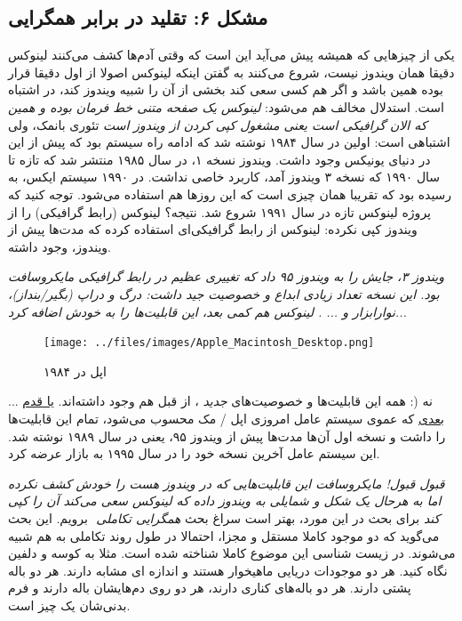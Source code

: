 \subsection*{مشکل ۶: تقلید در برابر همگرایی}
یکی از چیزهایی که همیشه پیش می‌آید این است که وقتی آدم‌ها کشف می‌کنند لینوکس دقیقا همان ویندوز نیست، شروع می‌کنند به گفتن اینکه لینوکس اصولا از اول دقیقا قرار بوده همین باشد و اگر هم کسی سعی کند بخشی از آن را شبیه ویندوز کند، در اشتباه است. استدلال مخالف هم می‌شود:
\emph{لینوکس یک صفحه متنی خط فرمان بوده و همین که الان گرافیکی است یعنی مشغول کپی کردن از ویندوز است}
تئوری بانمک، ولی اشتباهی است: اولین 
 در سال ۱۹۸۴ نوشته شد که ادامه راه سیستم 
 بود که پیش از این در دنیای یونیکس وجود داشت. ویندوز نسخه ۱، در سال ۱۹۸۵ منتشر شد که تازه تا سال ۱۹۹۰ که نسخه ۳ ویندوز آمد، کاربرد خاصی نداشت. در ۱۹۹۰ سیستم ایکس،‌ به 
 رسیده بود که تقریبا همان چیزی است که این روزها هم استفاده می‌شود. توجه کنید که پروژه لینوکس تازه در سال ۱۹۹۱ شروع شد. نتیجه؟ لینوکس 
 (رابط گرافیکی) را از ویندوز کپی نکرده: لینوکس از رابط گرافیکی‌ای استفاده کرده که مدت‌ها پیش از ویندوز، وجود داشته.

\emph{ویندوز ۳، جایش را به ویندوز ۹۵ داد که تغییری عظیم در رابط گرافیکی مایکروسافت بود. این نسخه تعداد زیادی ابداع و خصوصیت جید داشت:‌ درگ و دراپ (بگیر/بنداز)، نوارابزار و ... . لینوکس هم کمی بعد، این قابلیت‌ها را به خودش اضافه کرد...}
\begin{figure}[H]
\texttt{[image: ../files/images/Apple\_Macintosh\_Desktop.png]}
\caption*{اپل در ۱۹۸۴}
\end{figure}


... نه (: همه این قابلیت‌ها و خصوصیت‌های
\emph{جدید}
، از قبل هم وجود داشته‌اند.
\href{http://en.wikipedia.org/wiki/NeXTSTEP}{ یا قدم بعدی}
که عموی سیستم عامل امروزی اپل / مک محسوب می‌شود‌، تمام این قابلیت‌ها را داشت و نسخه اول آن‌ها مدت‌ها پیش از ویندوز ۹۵، یعنی در سال ۱۹۸۹ نوشته شد. این سیستم عامل آخرین نسخه خود را در سال ۱۹۹۵ به بازار عرضه کرد.

\emph{قبول قبول! مایکروسافت این قابلیت‌هایی که در ویندوز هست را خودش کشف نکرده اما به هرحال یک شکل و شمایلی به ویندوز داده که لینوکس سعی می‌کند آن را کپی کند}
برای بحث در این مورد، بهتر است سراغ بحث
\emph{همگرایی تکاملی}
‌ برویم. این بحث می‌گوید که دو موجود کاملا مستقل و مجزا، احتمالا در طول روند تکاملی به هم شبیه می‌شوند. در زیست شناسی این موضوع کاملا شناخته شده است. مثلا به کوسه و دلفین نگاه کنید. هر دو موجودات دریایی ماهیخوار هستند و اندازه ای مشابه دارند. هر دو باله پشتی دارند. هر دو باله‌های کناری دارند، هر دو روی دم‌هایشان باله دارند و فرم بدنی‌شان یک چیز است.

